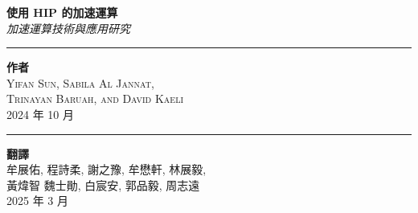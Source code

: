 \begin{titlepage}


\vspace{2.5cm}
\parbox[l]{.9\textwidth}{\centering
    {\HUGE \bfseries 使用 HIP 的加速運算}\\[2\baselineskip]
    {\Large \textit{加速運算技術與應用研究}}\\[.5\baselineskip]}

\vspace*{\fill}

\parbox[b]{.5\textwidth}{
    \rule{1pt}{.125\textheight}
    \hspace{0.025\textwidth}
    \parbox[b]{.8\textwidth}{
        {\Large \bfseries 作者}\\[1\baselineskip]
        {\Large \textsc{Yifan Sun, Sabila Al Jannat, \\ Trinayan Baruah, and David Kaeli}}\\[2\baselineskip]
        {\Large 2024 年 10 月}
    }
}
\parbox[b]{.5\textwidth}{
    \rule{1pt}{.125\textheight}
    \hspace{0.025\textwidth}
    \parbox[b]{.8\textwidth}{
        {\Large \bfseries 翻譯}\\[1\baselineskip]
        {\Large \textsc{牟展佑, 程詩柔, 謝之豫, 牟懋軒, 林展毅, \\ 黃煒智
魏士勛, 白宸安, 郭品毅, 周志遠}}\\[2\baselineskip]
        {\Large 2025 年 3 月}
    }
}
\end{titlepage}
